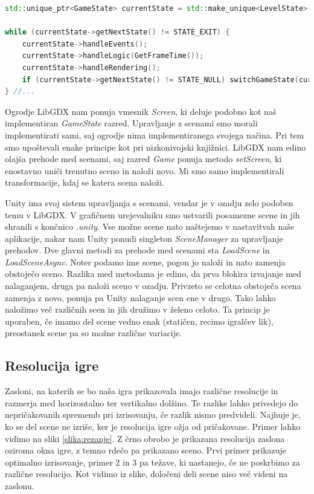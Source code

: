 \documentclass[12pt,a4paper,twoside]{book}
\begin{document}
\begin{lstlisting}[label=code:uporabaStanja, language=C++, caption=Uporaba stanja igre]
std::unique_ptr<GameState> currentState = std::make_unique<LevelState>();

while (currentState->getNextState() != STATE_EXIT) {
	currentState->handleEvents();
	currentState->handleLogic(GetFrameTime());
	currentState->handleRendering();
	if (currentState->getNextState() != STATE_NULL) switchGameState(currentState);
} //...
\end{lstlisting}

Ogrodje LibGDX nam ponuja vmesnik \textit{Screen}, ki deluje podobno kot naš implementiran \textit{GameState} razred. Upravljanje z scenami smo morali implementirati sami, saj ogrodje nima implementiranega svojega načina. Pri tem smo upoštevali enake principe kot pri nizkonivojski knjižnici. LibGDX nam edino olajša prehode med scenami, saj razred \textit{Game} ponuja metodo \textit{setScreen}, ki enostavno uniči trenutno sceno in naloži novo. Mi smo samo implementirali transformacije, kdaj se katera scena naloži.

Unity ima svoj sistem upravljanja s scenami, vendar je v ozadju zelo podoben temu v LibGDX. V grafičnem urejevalniku smo ustvarili posamezne scene in jih shranili s končnico \textit{.unity}. Vse možne scene nato naštejemo v nastavitvah naše aplikacije, nakar nam Unity ponudi singleton \textit{SceneManager} za upravljanje prehodov. Dve glavni metodi za prehode med scenami sta \textit{LoadScene} in \textit{LoadSceneAsync}. Noter podamo ime scene, pogon jo naloži in nato zamenja obstoječo sceno. Razlika med metodama je edino, da prva blokira izvajanje med nalaganjem, druga pa naloži sceno v ozadju. Privzeto se celotna obstoječa scena zamenja z novo, ponuja pa Unity nalaganje scen ene v drugo. Tako lahko naložimo več različnih scen in jih družimo v želeno celoto. Ta princip je uporaben, če imamo del scene vedno enak (statičen, recimo igralčev lik), preostanek scene pa so možne različne variacije.

\subsection{Resolucija igre}
Zasloni, na katerih se bo naša igra prikazovala imajo različne resolucije in razmerja med horizontalno ter vertikalno dolžino. Te razlike lahko privedejo do nepričakovanih sprememb pri izrisovanju, če razlik nismo predvideli. Najhuje je, ko se del scene ne izriše, ker je resolucija igre ožja od pričakovane. Primer lahko vidimo na sliki \ref{slika:rezanje}. Z črno obrobo je prikazana resolucija zaslona oziroma okna igre, z temno rdečo pa prikazano sceno. Prvi primer prikazuje optimalno izrisovanje, primer 2 in 3 pa težave, ki nastanejo, če ne poskrbimo za različne resolucijo. Kot vidimo iz slike, določeni deli scene niso več videni na zaslonu.
\end{document}
